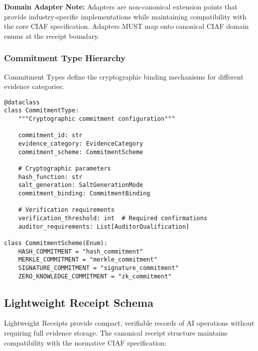 \documentclass[12pt,a4paper]{article}
\begin{document}
\textbf{Domain Adapter Note:} Adapters are non-canonical extension points that provide industry-specific implementations while maintaining compatibility with the core CIAF specification. Adapters MUST map onto canonical CIAF domain enums at the receipt boundary.

\subsubsection{Commitment Type Hierarchy}

Commitment Types define the cryptographic binding mechanisms for different evidence categories:

\begin{lstlisting}[caption=Commitment Type Implementation]
@dataclass
class CommitmentType:
    """Cryptographic commitment configuration"""
    
    commitment_id: str
    evidence_category: EvidenceCategory
    commitment_scheme: CommitmentScheme
    
    # Cryptographic parameters
    hash_function: str
    salt_generation: SaltGenerationMode
    commitment_binding: CommitmentBinding
    
    # Verification requirements
    verification_threshold: int  # Required confirmations
    auditor_requirements: List[AuditorQualification]
    
class CommitmentScheme(Enum):
    HASH_COMMITMENT = "hash_commitment"
    MERKLE_COMMITMENT = "merkle_commitment"
    SIGNATURE_COMMITMENT = "signature_commitment"
    ZERO_KNOWLEDGE_COMMITMENT = "zk_commitment"
\end{lstlisting}

\subsection{Lightweight Receipt Schema}

Lightweight Receipts provide compact, verifiable records of AI operations without requiring full evidence storage. The canonical receipt structure maintains compatibility with the normative CIAF specification:
\end{document}
